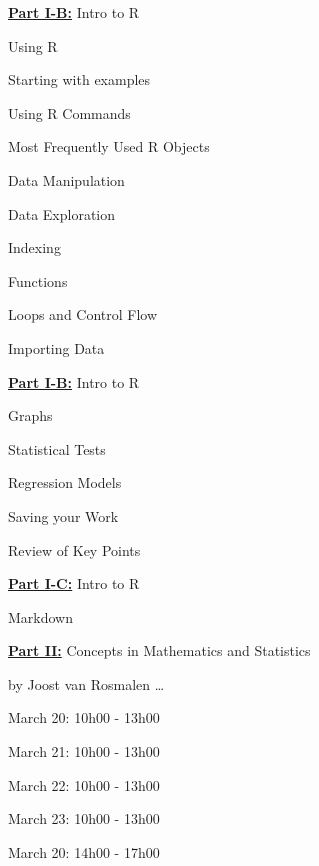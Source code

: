 \documentclass{presentatiesmetlogo}
\newcommand{\R}{{\textsf{R} }}
\begin{document}
\eitem
\bitem
\item {\huge \underline{\textbf{Part I-B:}} Intro to R}
\bitemt
\item Using \R
\item Starting with examples
\item Using \R Commands
\item Most Frequently Used R Objects
\item Data Manipulation
\item Data Exploration
\item Indexing
\item Functions
\item Loops and Control Flow
\item Importing Data
\eitemt
\eitem
\bitem
\item {\huge \underline{\textbf{Part I-B:}} Intro to R}
\newline
\newline
\bitemt
\item Graphs
\item Statistical Tests
\item Regression Models
\item Saving your Work
\item Review of Key Points
\eitemt
\eitem
\bitem
\item {\huge \underline{\textbf{Part I-C:}} Intro to R}
\newline
\newline
\bitemt
\item Markdown
\eitemt
\eitem
\bitem
\item {\huge \underline{\textbf{Part II:}} Concepts in Mathematics and Statistics}
\item[] by Joost van Rosmalen \ldots
\eitem
\bitem
\item March 20: 10h00 - 13h00
\item March 21: 10h00 - 13h00
\item March 22: 10h00 - 13h00
\item March 23: 10h00 - 13h00
\eitem
\bitem
\item March 20: 14h00 - 17h00
\end{document}
